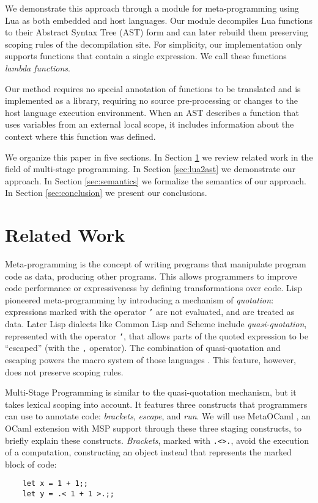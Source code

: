 \documentclass[english]{llncs}
\begin{document}
We demonstrate this approach through a module for meta-programming using Lua
as both embedded and host languages.
Our module decompiles Lua functions to their Abstract Syntax Tree (AST) form
and can later rebuild them preserving scoping rules of the decompilation site.
For simplicity, our implementation only supports functions that contain
a single expression.
We call these functions \emph{lambda functions}.

Our method requires no special annotation of functions to be translated and is
implemented as a library, requiring no source pre-processing or changes to
the host language execution environment.
When an AST describes a function that uses variables from an
external local scope, it includes information about the context
where this function was defined.

We organize this paper in five sections.
In Section \ref{sec:related} we review related work in the field
of multi-stage programming.
In Section \ref{sec:lua2ast} we demonstrate our approach.
In Section \ref{sec:semantics} we formalize the semantics of our approach.
In Section \ref{sec:conclusion} we present our conclusions.

\section{Related Work}
\label{sec:related}

Meta-programming is the concept of writing programs that manipulate
program code as data, producing other programs. This allows programmers
to improve code performance or expressiveness by defining transformations over code.
Lisp \cite{McCarthy1960RFS} pioneered meta-programming by introducing
a mechanism of \emph{quotation}: expressions marked with the operator \texttt{'}
are not evaluated, and are treated as data.
Later Lisp dialects like Common Lisp and Scheme include \emph{quasi-quotation},
represented with the operator \texttt{`}, that allows parts of the quoted expression
to be ``escaped'' (with the  \texttt{,} operator). The combination of
quasi-quotation and escaping powers the macro system of those languages \cite{Bawden1999quasiquotation}.
This feature, however, does not preserve scoping rules.

Multi-Stage Programming \cite{Taha1999MSP,Taha2004gentle,Taha2008gentle} is
similar to the quasi-quotation mechanism,
but it takes lexical scoping into account.
It features three constructs that programmers can use to
annotate code: \emph{brackets}, \emph{escape}, and \emph{run}.
We will use MetaOCaml \cite{Calcagno2003implementing}, an OCaml extension
with MSP support through these three staging constructs, to briefly explain
these constructs. \emph{Brackets}, marked with \texttt{.<>.}, avoid the execution of a computation,
constructing an object instead that represents the marked block of code:
\begin{verbatim}
    let x = 1 + 1;;
    let y = .< 1 + 1 >.;;
\end{verbatim}
\end{document}
